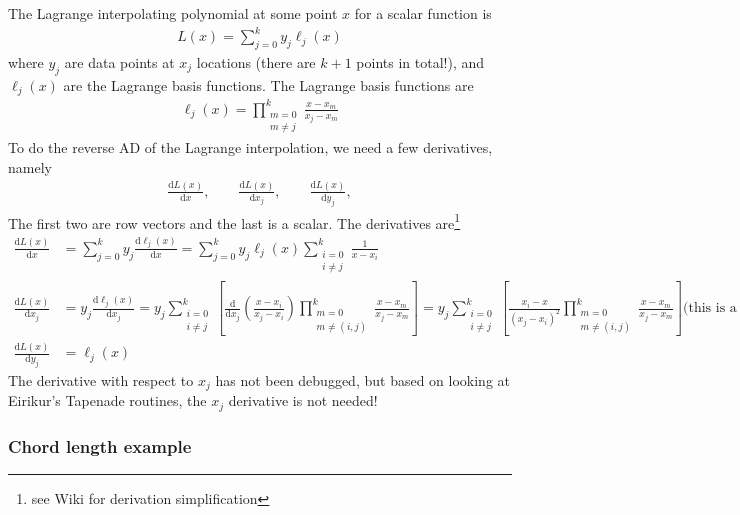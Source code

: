 \documentclass[10pt]{article}
\newcommand{\dd}[2]{\frac{\textrm{d} #1}{\textrm{d} #2}}
\newcommand{\ben}{\begin{eqnarray*}}
\newcommand{\een}{\end{eqnarray*}}
\newcommand{\beq}{\begin{equation}\begin{aligned}}
\newcommand{\eeq}{\end{aligned}\end{equation}}
\newcommand{\tn}[1]{\textrm{#1}}
\begin{document}
The Lagrange interpolating polynomial at some point $x$ for a scalar function is
\beq
L(x) = \sum_{j=0}^{k} y_j \ell_j(x)
\eeq
where $y_j$ are data points at $x_j$ locations (there are $k+1$ points in total!), and $\ell_j(x)$ are the Lagrange basis functions.
The Lagrange basis functions are
\beq
\ell_j(x) = \prod_{\substack{m=0 \\ m \neq j}}^{k} \frac{x-x_m}{x_j-x_m}
\eeq
To do the reverse AD of the Lagrange interpolation, we need a few derivatives, namely
\ben
\dd{L(x)}{x},
\qquad
\dd{L(x)}{x_j},
\qquad
\dd{L(x)}{y_j},
\een
The first two are row vectors and the last is a scalar.
The derivatives are\footnote{see Wiki for derivation simplification}
\beq
\dd{L(x)}{x} &= \sum_{j=0}^{k} y_j \dd{\ell_j(x)}{x}
=
\sum_{j=0}^{k} y_j { \ell_j(x) \sum_{\substack{i=0\\i\neq j}}^{k} \frac{1}{x - x_i}}
\\
\dd{L(x)}{x_j} &=  y_j \dd{\ell_j(x)}{x_j} =
y_j \sum_{\substack{i=0 \\ i \neq j}}^{k} \left[
	\dd{}{x_j}\left(
	\frac{x-x_i}{x_j-x_i}
	\right)
	\prod_{\substack{m=0 \\m\neq (i,j)}}^{k} \frac{x-x_m}{x_j-x_m}
	\right]
=
y_j \sum_{\substack{i=0 \\ i \neq j}}^{k} \left[
	\frac{x_i - x}{(x_j-x_i)^2} \prod_{\substack{m=0 \\m\neq (i,j)}}^{k} \frac{x-x_m}{x_j-x_m}
	\right]
\tn{(this is a vector)}
\\
\dd{L(x)}{y_j} &=  \ell_j(x)
\eeq
The derivative with respect to $x_j$ has not been debugged, but based on looking at Eirikur's Tapenade routines, the $x_j$ derivative is not needed!

\subsubsection{Chord length example}
\end{document}
